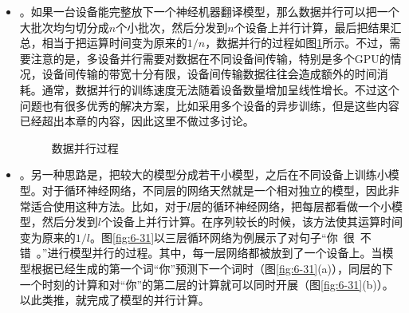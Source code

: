 \begin{itemize}
\vspace{0.5em}

\item {\small{}}。如果一台设备能完整放下一个神经机器翻译模型，那么数据并行可以把一个大批次均匀切分成$n$个小批次，然后分发到$n$个设备上并行计算，最后把结果汇总，相当于把运算时间变为原来的${1}/{n}$，数据并行的过程如图\ref{fig:6-30}所示。不过，需要注意的是，多设备并行需要对数据在不同设备间传输，特别是多个GPU的情况，设备间传输的带宽十分有限，设备间传输数据往往会造成额外的时间消耗\cite{xiao2017fast}。通常，数据并行的训练速度无法随着设备数量增加呈线性增长。不过这个问题也有很多优秀的解决方案，比如采用多个设备的异步训练，但是这些内容已经超出本章的内容，因此这里不做过多讨论。

\begin{figure}[htp]
\centering

\caption{数据并行过程}
\label{fig:6-30}
\end{figure}

\vspace{0.5em}
\item {\small{}}。另一种思路是，把较大的模型分成若干小模型，之后在不同设备上训练小模型。对于循环神经网络，不同层的网络天然就是一个相对独立的模型，因此非常适合使用这种方法。比如，对于$l$层的循环神经网络，把每层都看做一个小模型，然后分发到$l$个设备上并行计算。在序列较长的时候，该方法使其运算时间变为原来的${1}/{l}$。图\ref{fig:6-31}以三层循环网络为例展示了对句子``你\ 很\ 不错\ 。''进行模型并行的过程。其中，每一层网络都被放到了一个设备上。当模型根据已经生成的第一个词``你''预测下一个词时（图\ref{fig:6-31}(a)），同层的下一个时刻的计算和对``你''的第二层的计算就可以同时开展（图\ref{fig:6-31}(b)）。以此类推，就完成了模型的并行计算。
\vspace{0.5em}
\end{itemize}

